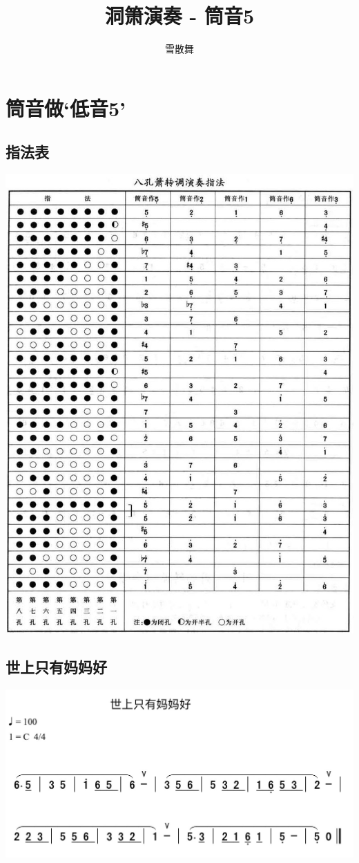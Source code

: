 \documentclass[cn,pad,chinese,chinesefont=nofont]{elegantbook}
\title{洞箫演奏 - 筒音5}
\author{雪散舞}
\date{\zhtoday}
\begin{document}
\maketitle
\frontmatter
\tableofcontents
\mainmatter

\centering
\chapter{筒音做‘低音5’}
\section{指法表}
\includegraphics[width=\textwidth]{dongxiao/20200408-八孔箫指法图.jpg}
\section{世上只有妈妈好}
	\includegraphics[width=\textwidth]{dongxiao/IMG_0854-世上只有妈妈好.png}
\end{document}
